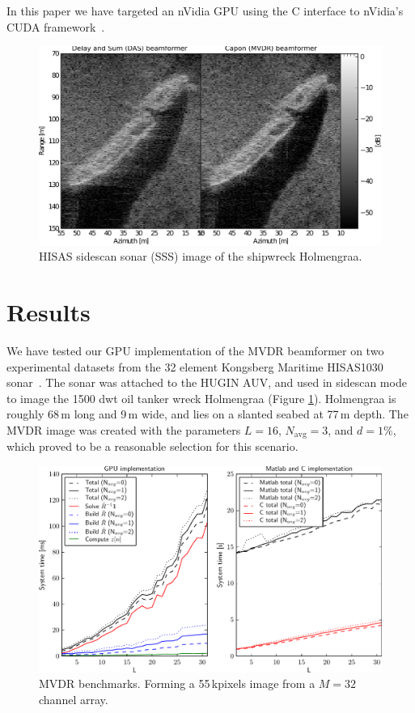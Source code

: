 \documentclass[10pt,a4paper]{article}
\newcommand\Fig[1]{Figure \ref{#1}}
\newcommand\1{\vec 1}
\begin{document}
In this paper we have targeted an nVidia \gls{GPU} using the C interface to nVidia's \gls{CUDA} framework~\cite{NvidiaCuda}.

\begin{figure}[!t]
\centering
\includegraphics[width=\linewidth]{gfx/img_holmengraa.pdf}
\caption{HISAS sidescan sonar (SSS) image of the shipwreck Holmengraa.}\label{holmengraa}
\end{figure}


\newpage
\section{Results}

We have tested our \gls{GPU} implementation of the \gls{MVDR} beamformer on two experimental datasets from the 32 element Kongsberg Maritime HISAS1030 sonar~\cite{Hansen2009}. The sonar was attached to the HUGIN \gls{AUV}, and used in sidescan mode to image the 1500 dwt oil tanker wreck Holmengraa (\Fig{holmengraa}). Holmengraa is roughly 68\,m long and 9\,m wide, and lies on a slanted seabed at 77\,m depth. The \gls{MVDR} image was created with the parameters $L=16$, $N_\text{avg}=3$, and $d=1\%$, which proved to be a reasonable selection for this scenario.

\begin{figure}[!t]
\centering
\includegraphics[width=\linewidth]{gfx/benchmark.pdf}
\caption{\gls{MVDR} benchmarks. Forming a 55\,kpixels image from a $M=32$ channel array.}\label{benchmarks}
\end{figure}
\end{document}
